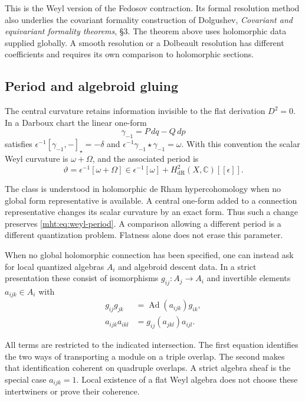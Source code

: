 This is the Weyl version of the Fedosov contraction. Its formal
resolution method also underlies the covariant formality
construction of Dolgushev, \emph{Covariant and equivariant formality
theorems}, \S3. The theorem above uses holomorphic data supplied
globally. A smooth resolution or a Dolbeault resolution has
different coefficients and requires its own comparison to
holomorphic sections.

\subsection*{Period and algebroid gluing}

The central curvature retains information invisible to the flat
derivation $D^2=0$. In a Darboux chart the linear one-form
\[
 \gamma_{-1}=P\,dq-Q\,dp
\]
satisfies
$\epsilon^{-1}[\gamma_{-1},-]_\star=-\delta$ and
$\epsilon^{-1}\gamma_{-1}\star\gamma_{-1}=\omega$.
With this convention the scalar Weyl curvature is
$\omega+\Omega$, and the associated period is
\begin{equation}\label{mht:eq:weyl-period}
 \vartheta=\epsilon^{-1}[\omega+\Omega]
 \in\epsilon^{-1}[\omega]+H^2_{\mathrm{dR}}(X,\mathbb C)[[\epsilon]].
\end{equation}

The class is understood in holomorphic de Rham hypercohomology
when no global form representative is available. A central
one-form added to a connection representative changes its scalar
curvature by an exact form. Thus such a change preserves
\eqref{mht:eq:weyl-period}. A comparison allowing a different
period is a different quantization problem. Flatness alone does
not erase this parameter.

When no global holomorphic connection has been specified, one
can instead ask for local quantized algebras $A_i$ and algebroid
descent data. In a strict presentation these consist of
isomorphisms $g_{ij}:A_j\to A_i$ and invertible elements
$a_{ijk}\in A_i$ with
\begin{align*}
 g_{ij}g_{jk}&=\operatorname{Ad}(a_{ijk})g_{ik},\\
 a_{ijk}a_{ikl}&=g_{ij}(a_{jkl})a_{ijl}.
\end{align*}

All terms are restricted to the indicated intersection.
The first equation identifies the two ways of transporting a
module on a triple overlap. The second makes that identification
coherent on quadruple overlaps. A strict algebra sheaf is the
special case $a_{ijk}=1$. Local existence of a flat Weyl algebra
does not choose these intertwiners or prove their coherence.

